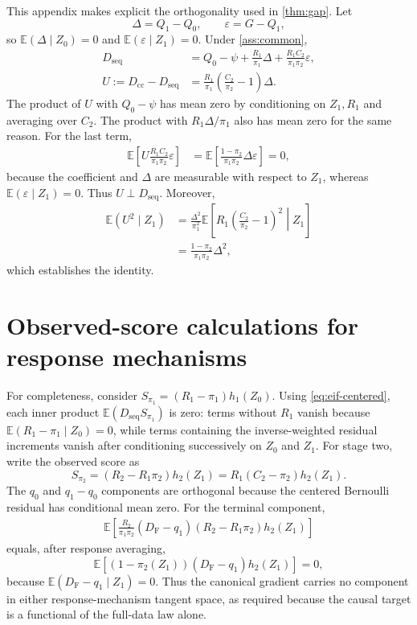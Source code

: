 \documentclass[11pt]{article}
\theoremstyle{definition}
\newcommand{\E}{\mathbb{E}}
\newcommand{\1}{\mathbf{1}}
\newcommand{\cc}{\mathrm{cc}}
\newcommand{\seq}{\mathrm{seq}}
\newcommand{\F}{\mathrm{F}}
\begin{document}
This appendix makes explicit the orthogonality used in \cref{thm:gap}. Let
\[
\Delta=Q_1-Q_0,\qquad \varepsilon=G-Q_1,
\]
so $\E(\Delta\mid Z_0)=0$ and $\E(\varepsilon\mid Z_1)=0$. Under \cref{ass:common},
\begin{align*}
D_{\seq}&=Q_0-\psi+\frac{R_1}{\pi_1}\Delta
+\frac{R_1C_2}{\pi_1\pi_2}\varepsilon,\\
U:=D_{\cc}-D_{\seq}
&=\frac{R_1}{\pi_1}\left(\frac{C_2}{\pi_2}-1\right)\Delta.
\end{align*}
The product of $U$ with $Q_0-\psi$ has mean zero by conditioning on $Z_1,R_1$ and averaging over $C_2$. The product with $R_1\Delta/\pi_1$ also has mean zero for the same reason. For the last term,
\begin{align*}
\E\!\left[
U\frac{R_1C_2}{\pi_1\pi_2}\varepsilon
\right]
&=\E\!\left[
\frac{1-\pi_2}{\pi_1\pi_2}\Delta\varepsilon
\right]=0,
\end{align*}
because the coefficient and $\Delta$ are measurable with respect to $Z_1$, whereas $\E(\varepsilon\mid Z_1)=0$. Thus $U\perp D_{\seq}$. Moreover,
\begin{align*}
\E(U^2\mid Z_1)
&=\frac{\Delta^2}{\pi_1^2}
\E\!\left[R_1\left(\frac{C_2}{\pi_2}-1\right)^2\middle|Z_1\right]\\
&=\frac{1-\pi_2}{\pi_1\pi_2}\Delta^2,
\end{align*}
which establishes the identity.

\section{Observed-score calculations for response mechanisms}\label{app:scores}

For completeness, consider $S_{\pi_1}=(R_1-\pi_1)h_1(Z_0)$. Using \cref{eq:eif-centered}, each inner product $\E(D_{\seq}S_{\pi_1})$ is zero: terms without $R_1$ vanish because $\E(R_1-\pi_1\mid Z_0)=0$, while terms containing the inverse-weighted residual increments vanish after conditioning successively on $Z_0$ and $Z_1$. For stage two, write the observed score as
\[
S_{\pi_2}=(R_2-R_1\pi_2)h_2(Z_1)=R_1(C_2-\pi_2)h_2(Z_1).
\]
The $q_0$ and $q_1-q_0$ components are orthogonal because the centered Bernoulli residual has conditional mean zero. For the terminal component,
\begin{align*}
\E\!\left[
\frac{R_2}{\pi_1\pi_2}(D_{\F}-q_1)
(R_2-R_1\pi_2)h_2(Z_1)
\right]
\end{align*}
equals, after response averaging,
\[
\E\!\left[(1-\pi_2(Z_1))(D_{\F}-q_1)h_2(Z_1)\right]=0,
\]
because $\E(D_{\F}-q_1\mid Z_1)=0$. Thus the canonical gradient carries no component in either response-mechanism tangent space, as required because the causal target is a functional of the full-data law alone.


\end{document}
